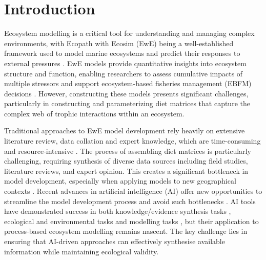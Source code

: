 \section{Introduction}

Ecosystem modelling is a critical tool for understanding and managing complex environments, with Ecopath with Ecosim (EwE) being a well-established framework used to model marine ecosystems and predict their responses to external pressures \citep{Christensen2004, Colleter2015}. EwE models provide quantitative insights into ecosystem structure and function, enabling researchers to assess cumulative impacts of multiple stressors and support ecosystem-based fisheries management (EBFM) decisions \citep{Coll2015, Villasante2016,Geary2020}. However, constructing these models presents significant challenges, particularly in constructing and parameterizing diet matrices that capture the complex web of trophic interactions within an ecosystem.

Traditional approaches to EwE model development rely heavily on extensive literature review, data collation and expert knowledge, which are time-consuming and resource-intensive \citep{Holden2024a}. The process of assembling diet matrices is particularly challenging, requiring synthesis of diverse data sources including field studies, literature reviews, and expert opinion. This creates a significant bottleneck in model development, especially when applying models to new geographical contexts \citep{Holden2024b}. Recent advances in artificial intelligence (AI) offer new opportunities to streamline the model development process and avoid such bottlenecks \citep{spilliasfuture}. AI tools have demonstrated success in both knowledge/evidence synthesis tasks \citep{spillias2024human,keck2025extracting,castro2024large,spillias2024evaluating,Zheng2023,nugraha2024traditional}, ecological and environmental tasks \citep{Fernandes2024,Li2024,Chen2024,dorm2025large} and modelling tasks \citep{Lapeyrolerie2022, Tuia2022, Karniadakis2021}, but their application to process-based ecosystem modelling remains nascent. The key challenge lies in ensuring that AI-driven approaches can effectively synthesise available information while maintaining ecological validity.

